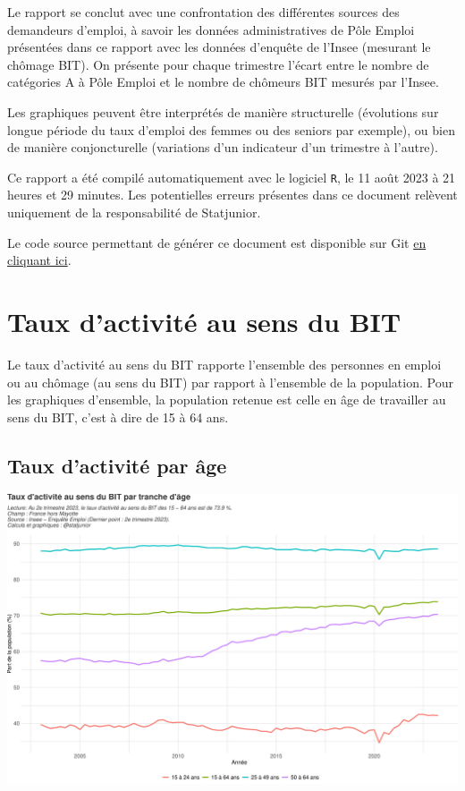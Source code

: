 \documentclass[
  paper=a4,
  ,captions=tableheading
]{scrartcl}
\begin{document}
Le rapport se conclut avec une confrontation des différentes sources des
demandeurs d'emploi, à savoir les données administratives de Pôle Emploi
présentées dans ce rapport avec les données d'enquête de l'Insee
(mesurant le chômage BIT). On présente pour chaque trimestre l'écart
entre le nombre de catégories A à Pôle Emploi et le nombre de chômeurs
BIT mesurés par l'Insee.

Les graphiques peuvent être interprétés de manière structurelle
(évolutions sur longue période du taux d'emploi des femmes ou des
seniors par exemple), ou bien de manière conjoncturelle (variations d'un
indicateur d'un trimestre à l'autre).

Ce rapport a été compilé automatiquement avec le logiciel \texttt{R}, le
11 août 2023 à 21 heures et 29 minutes. Les potentielles erreurs
présentes dans ce document relèvent uniquement de la responsabilité de
Statjunior.

Le code source permettant de générer ce document est disponible sur Git
\href{https://github.com/statjunior/Statjunior/blob/main/March\%C3\%A9\%20du\%20travail\%20et\%20ch\%C3\%B4mage/}{en
cliquant ici}.

\newpage

\hypertarget{taux-dactivituxe9-au-sens-du-bit}{%
\section{Taux d'activité au sens du
BIT}\label{taux-dactivituxe9-au-sens-du-bit}}

Le taux d'activité au sens du BIT rapporte l'ensemble des personnes en
emploi ou au chômage (au sens du BIT) par rapport à l'ensemble de la
population. Pour les graphiques d'ensemble, la population retenue est
celle en âge de travailler au sens du BIT, c'est à dire de 15 à 64 ans.

\hypertarget{taux-dactivituxe9-par-uxe2ge}{%
\subsection{Taux d'activité par
âge}\label{taux-dactivituxe9-par-uxe2ge}}

\includegraphics{rapport_activite_emploi_chomage_insee_files/figure-latex/unnamed-chunk-2-1.pdf}
\end{document}
